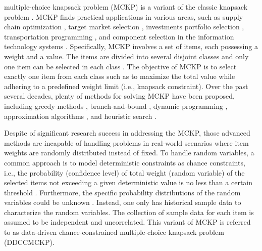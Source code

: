 \documentclass[lettersize,journal]{IEEEtran}
\begin{document}
 multiple-choice knapsack problem (MCKP) is a variant of the classic knapsack problem \cite{sinha1979multiple}.
MCKP finds practical applications in various areas, such as supply chain optimization \cite{sharkey2011class}, target market selection \cite{taaffe2008target}, investments portfolio selection \cite{nauss19780}, transportation programming \cite{zhong2010multiple}, and component selection in the information technology systems \cite{kwong2010optimization}.
Specifically, MCKP involves a set of items, each possessing a weight and a value. The items are divided into several disjoint classes and only one item can be selected in each class \cite{sinha1979multiple,kellerer2004multiple}. The objective of MCKP is to select exactly one item from each class such as to maximize the total value while adhering to a predefined weight limit (i.e., knapsack constraint).
Over the past several decades, plenty of methods for solving MCKP have been proposed, including greedy methods \cite{zemel1980linear}, branch-and-bound \cite{dyer1984branch}, dynamic programming \cite{dudzinski1987exact}, approximation algorithms \cite{gens1998approximate}, and heuristic search \cite{hifi2006reactive}.

Despite of significant research success in addressing the MCKP, those advanced methods are incapable of handling problems in real-world scenarios where item weights are randomly distributed instead of fixed.
To handle random variables, a common approach is to model deterministic constraints as chance constraints, i.e., the probability (confidence level) of total weight (random variable) of the selected items not exceeding a given deterministic value is no less than a certain threshold \cite{doerr2020optimization,shapiro2021lectures}.
Furthermore, the specific probability distributions of the random variables could be unknown \cite{ji2021data,xie2021distributionally}.
Instead, one only has historical sample data to characterize the random variables. 
The collection of sample data for each item is assumed to be independent and uncorrelated.
This variant of MCKP is referred to as data-driven chance-constrained multiple-choice knapsack problem (DDCCMCKP). 
\end{document}
